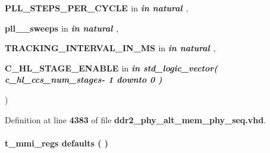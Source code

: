 {\begin{DoxyParamCaption}
\item[{}]{{\bfseries \textcolor{vhdlchar}{P\+L\+L\+\_\+\+S\+T\+E\+P\+S\+\_\+\+P\+E\+R\+\_\+\+C\+Y\+C\+LE}\textcolor{vhdlchar}{ }}\textcolor{stringliteral}{in} {\em {\bfseries \textcolor{keywordflow}{in}\textcolor{vhdlchar}{ }\textcolor{comment}{natural}\textcolor{vhdlchar}{ }\textcolor{vhdlchar}{ }\textcolor{vhdlchar}{ }}} , }
\item[{}]{{\bfseries \textcolor{vhdlchar}{pll\+\_\+\_\+sweeps}\textcolor{vhdlchar}{ }}\textcolor{stringliteral}{in} {\em {\bfseries \textcolor{keywordflow}{in}\textcolor{vhdlchar}{ }\textcolor{comment}{natural}\textcolor{vhdlchar}{ }\textcolor{vhdlchar}{ }\textcolor{vhdlchar}{ }}} , }
\item[{}]{{\bfseries \textcolor{vhdlchar}{T\+R\+A\+C\+K\+I\+N\+G\+\_\+\+I\+N\+T\+E\+R\+V\+A\+L\+\_\+\+I\+N\+\_\+\+MS}\textcolor{vhdlchar}{ }}\textcolor{stringliteral}{in} {\em {\bfseries \textcolor{keywordflow}{in}\textcolor{vhdlchar}{ }\textcolor{comment}{natural}\textcolor{vhdlchar}{ }\textcolor{vhdlchar}{ }\textcolor{vhdlchar}{ }}} , }
\item[{}]{{\bfseries \textcolor{vhdlchar}{C\+\_\+\+H\+L\+\_\+\+S\+T\+A\+G\+E\+\_\+\+E\+N\+A\+B\+LE}\textcolor{vhdlchar}{ }}\textcolor{stringliteral}{in} {\em {\bfseries \textcolor{keywordflow}{in}\textcolor{vhdlchar}{ }\textcolor{comment}{std\+\_\+logic\+\_\+vector}\textcolor{vhdlchar}{(}\textcolor{vhdlchar}{ }\textcolor{vhdlchar}{ }\textcolor{vhdlchar}{ }\textcolor{vhdlchar}{c\+\_\+hl\+\_\+ccs\+\_\+num\+\_\+stages}\textcolor{vhdlchar}{-\/}\textcolor{vhdlchar}{ } \textcolor{vhdldigit}{1} \textcolor{vhdlchar}{ }\textcolor{keywordflow}{downto}\textcolor{vhdlchar}{ }\textcolor{vhdlchar}{ } \textcolor{vhdldigit}{0} \textcolor{vhdlchar}{)}\textcolor{vhdlchar}{ }\textcolor{vhdlchar}{ }\textcolor{vhdlchar}{ }}}}
\end{DoxyParamCaption}
)\hspace{0.3cm}{\ttfamily [Function]}}\label{class__ddr2__phy__alt__mem__phy__regs__pkg_aa2abf8ee62f1c2ce11a58c6a84c7fcd7}


Definition at line {\bf 4383} of file {\bf ddr2\+\_\+phy\+\_\+alt\+\_\+mem\+\_\+phy\+\_\+seq.\+vhd}.

\paragraph[{defaults}]{\setlength{\rightskip}{0pt plus 5cm} {\bfseries \textcolor{vhdlchar}{t\+\_\+mmi\+\_\+regs}\textcolor{vhdlchar}{ }} defaults ( ) \hspace{0.3cm}{\ttfamily [Function]}}\label{class__ddr2__phy__alt__mem__phy__regs__pkg_ade0cc92e1e4fe3525dbcd920233a473f}


